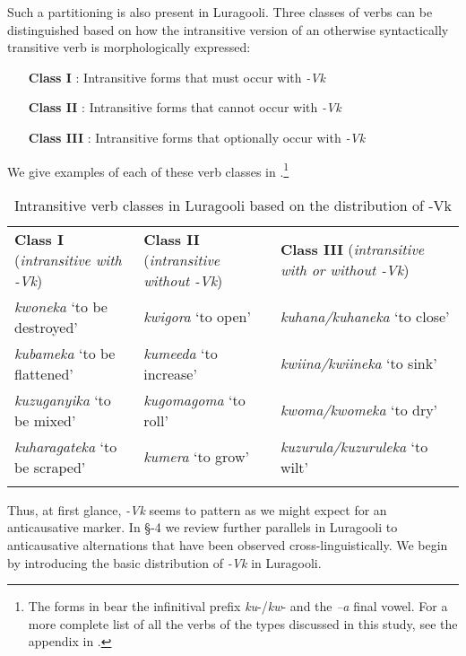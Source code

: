 \documentclass[output=paper]{langsci/langscibook}
\begin{document}
     
Such a partitioning is also present in Luragooli. Three classes of verbs can be distinguished based on how the intransitive version of an otherwise syntactically transitive verb is morphologically expressed:

\begin{itemize}
     \item[\textbf{  Class I}]: Intransitive forms that must occur with \textit{-Vk}\\
     \item[\textbf{  Class II}]: Intransitive forms that cannot occur with \textit{-Vk}\\
     \item[\textbf{  Class III}]: Intransitive forms that optionally occur with \textit{-Vk}\\
\end{itemize}

     
We give examples of each of these verb classes in .\footnote{The forms in  bear the infinitival prefix \textit{ku}-/\textit{kw}- and the \textit{–a} final vowel. For a more complete list of all the verbs of the types discussed in this study, see the appendix in \citet{BowlerGluckman2015}.}

\begin{table}
\caption{Intransitive verb classes in Luragooli based on the distribution of -Vk}
\label{tab:1}

\begin{tabularx}{\textwidth}{XXX}
\lsptoprule

\textbf{Class I} (\textit{intransitive with -Vk}) & \textbf{Class II} (\textit{intransitive without -Vk}) & \textbf{Class III} (\textit{intransitive with or without -Vk})\\
\textit{kwoneka} ‘to be destroyed’ & \textit{kwigora} ‘to open’ & \textit{kuhana/kuhaneka} ‘to close’\\
\textit{kubameka} ‘to be flattened’ & \textit{kumeeda} ‘to increase’ & \textit{kwiina/kwiineka} ‘to sink’\\
\textit{kuzuganyika} ‘to be mixed’ & \textit{kugomagoma} ‘to roll’ & \textit{kwoma/kwomeka} ‘to dry’\\
\textit{kuharagateka} ‘to be scraped’ & \textit{kumera} ‘to grow’ & \textit{kuzurula/kuzuruleka} ‘to wilt’\\
\lspbottomrule
\end{tabularx}
\end{table}


Thus, at first glance, \textit{-Vk }seems to pattern as we might expect for an anticausative marker. In §-4 we review further parallels in Luragooli to anticausative alternations that have been observed cross-linguistically. We begin  by introducing the basic distribution of \textit{-Vk} in Luragooli.
\end{document}
